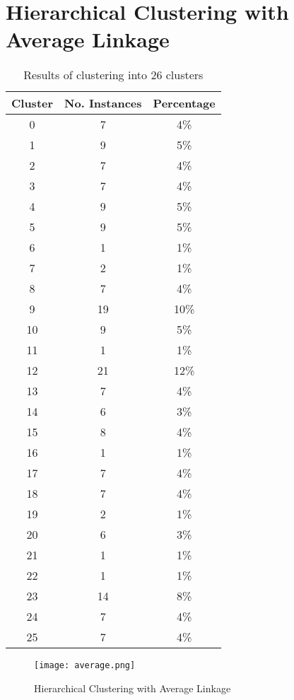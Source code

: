 \documentclass[
11pt, %
a4paper, %
oneside, %
headinclude,footinclude, %
BCOR5mm, %
]{scrartcl}
\begin{document}
\newpage
\section{Hierarchical Clustering with Average Linkage}
\begin{table}[h!]
	\centering
	\caption{Results of clustering into 26 clusters}
	\label{table:average}
	\begin{tabular}{||c c c||} 
		\hline
		Cluster & No. Instances & Percentage \\ [0.5ex] 
		\hline\hline
		0 & 7 &  4\% \\
		1 & 9 & 5\% \\
		2 & 7 & 4\% \\
		3 & 7 & 4\% \\
		4 & 9 & 5\% \\
		5 & 9 & 5\% \\
		6 & 1 & 1\% \\
		7 & 2 & 1\% \\
		8 & 7 & 4\% \\
		9 & 19 & 10\% \\
		10 & 9 & 5\% \\
		11 & 1 & 1\% \\
		12 & 21 & 12\% \\
		13 & 7 & 4\% \\
		14 & 6 & 3\% \\
		15 & 8 & 4\% \\
		16 & 1 & 1\% \\
		17 & 7 & 4\% \\
		18 & 7 & 4\% \\
		19 & 2 & 1\% \\
		20 & 6 & 3\% \\
		21 & 1 & 1\% \\
		22 & 1 & 1\% \\
		23 & 14 & 8\% \\
		24 & 7 & 4\% \\
		25 & 7 & 4\%\\ [1ex] 
		\hline
	\end{tabular}
\end{table}
\newpage
\begin{figure}[h]
	\centering
	\texttt{[image: average.png]}
	\caption{Hierarchical Clustering with Average Linkage}
	\label{figure:average}
\end{figure}
\end{document}
